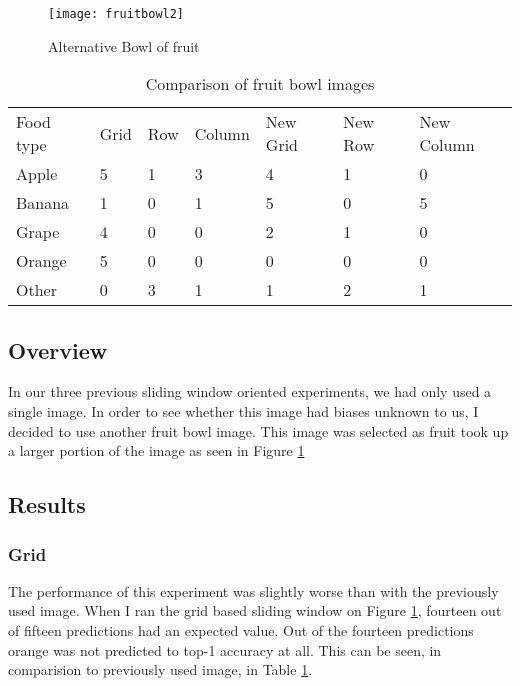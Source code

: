 \begin{figure}
    \texttt{[image: fruitbowl2]}
    \caption{Alternative Bowl of fruit}
    \label{fig:newFruit}
\end{figure}

\begin{table}[]
    \centering
    \caption{Comparison of fruit bowl images}
    \label{newFruitTable}
    \begin{tabular}{lllllll}
        Food type & Grid & Row & Column & New Grid & New Row & New Column \\
        Apple     & 5    & 1   & 3      & 4        & 1       & 0          \\
        Banana    & 1    & 0   & 1      & 5        & 0       & 5          \\
        Grape     & 4    & 0   & 0      & 2        & 1       & 0          \\
        Orange    & 5    & 0   & 0      & 0        & 0       & 0          \\
        Other     & 0    & 3   & 1      & 1        & 2       & 1         
    \end{tabular}
\end{table}

\subsection*{Overview}
In our three previous sliding window oriented experiments, we had only used a
single image. In order to see whether this image had biases unknown
to us, I decided to use another fruit bowl image. This image was selected as
fruit took up a larger portion of the image as seen in Figure \ref{fig:newFruit}

\subsection*{Results}
\subsubsection*{Grid}
The performance of this experiment was slightly worse than with the previously
used image. When I ran the grid based sliding window on Figure
\ref{fig:newFruit}, fourteen out of fifteen predictions had an expected value.
Out of the fourteen predictions orange was not predicted to top-1 accuracy at
all. This can be seen, in comparision to previously used image, in Table
\ref{newFruitTable}.

